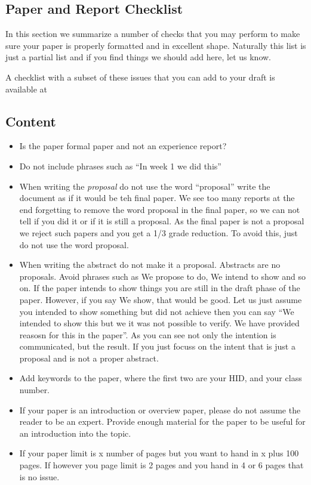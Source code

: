 \subsection{Paper and Report Checklist}\label{paper-checklist}

In this section we summarize a number of checks that you may perform to
make sure your paper is properly formatted and in excellent shape.
Naturally this list is just a partial list and if you find things we
should add here, let us know.

A checklist with a subset of these issues that you can add to your draft is available at


\subsection{Content}

\begin{itemize}[label=$\Box$]
    \item Is the paper formal paper and not an experience report? 
    \item Do not include phrases such as ``In week 1 we did this''
    \item When writing the \textit{proposal} do not use the word ``proposal''
      write the document as if it would be teh final paper. We see too
      many reports at the end forgetting to remove the word proposal
      in the final paper, so we can not tell if you did it or if it is
      still a proposal. As the final paper is not a proposal we reject
      such papers and you get a 1/3 grade reduction. To avoid this,
      just do not use the word proposal.
    \item When writing the abstract do not make it a
      proposal. Abstracts are no proposals. Avoid phrases such as We
      propose to do, We intend to show and so on. If the paper intends
      to show things you are still in the draft phase of the
      paper. However, if you say We show, that would be good. Let us
      just assume you intended to show something but did not achieve
      then you can say ``We intended to show this but we it was not
      possible to verify. We have provided reasosn for this in the
      paper''. As you can see not only the intention is communicated,
      but the result. If you just focuss on the intent that is just a
      proposal and is not a proper abstract.
    \item Add keywords to the paper, where the first two are your HID,
      and your class number.
    \item If your paper is an introduction or overview paper, please
      do not assume the reader to be an expert. Provide enough
      material for the paper to be useful for an introduction into the
      topic.
    \item If your paper limit is x number of pages but you want to
      hand in x plus 100 pages. If however you page limit is 2 pages
      and you hand in 4 or 6 pages that is no issue.
\end{itemize}

